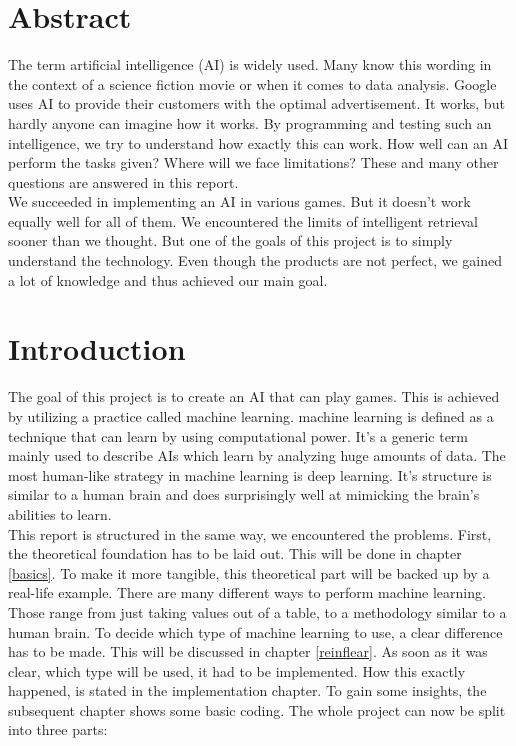 \documentclass[12pt]{article}
\begin{document}
\section{Abstract}
The term \gls{artificial intelligence} (\gls{AI}) is widely used. Many know this wording in the context of a science fiction movie or when it comes to data analysis. Google uses \gls{AI} to provide their customers with the optimal advertisement. It works, but hardly anyone can imagine how it works. By programming and testing such an intelligence, we try to understand how exactly this can work. How well can an \gls{AI} perform the tasks given? Where will we face limitations? These and many other questions are answered in this report. \\
We succeeded in implementing an \gls{AI} in various games. But it doesn't work equally well for all of them. We encountered the limits of intelligent retrieval sooner than we thought. But one of the goals of this project is to simply understand the technology. Even though the products are not perfect, we gained a lot of knowledge and thus achieved our main goal.
\section{Introduction}
The goal of this project is to create an \gls{AI} that can play games. This is achieved by utilizing a practice called \gls{machine learning}. \Gls{machine learning} is defined as a technique that can learn by using \gls{computational power}. It's a generic term mainly used to describe \gls{AI}s which learn by analyzing huge amounts of data. 
The most human-like strategy in \gls{machine learning} is \gls{deep learning}. It's structure is similar to a human brain and does surprisingly well at mimicking the brain's abilities to learn. \\
This report is structured in the same way, we encountered the problems. First, the theoretical foundation has to be laid out. This will be done in chapter \ref{basics}. To make it more tangible, this theoretical part will be backed up by a real-life example. There are many different ways to perform \gls{machine learning}. Those range from just taking values out of a table, to a methodology similar to a human brain. To decide which type of \gls{machine learning} to use, a clear difference has to be made. This will be discussed in chapter \ref{reinflear}. As soon as it was clear, which type will be used, it had to be implemented. How this exactly happened, is stated in the implementation chapter. To gain some insights, the subsequent chapter shows some basic coding. \clearpage The whole project can now be split into three parts: 
\end{document}
